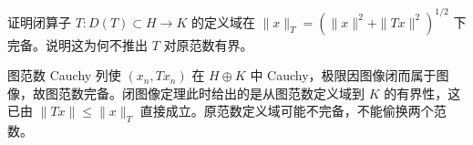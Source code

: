 \begin{exercise}[图范数与闭算子]\label{ex:y7-graph}
证明闭算子 $T:D(T)\subset H\to K$ 的定义域在 $\|x\|_T=(\|x\|^2+\|Tx\|^2)^{1/2}$ 下完备。说明这为何不推出 $T$ 对原范数有界。
\end{exercise}
\begin{solution}
图范数 Cauchy 列使 $(x_n,Tx_n)$ 在 $H\oplus K$ 中 Cauchy，极限因图像闭而属于图像，故图范数完备。闭图像定理此时给出的是从图范数定义域到 $K$ 的有界性，这已由 $\|Tx\|\le\|x\|_T$ 直接成立。原范数定义域可能不完备，不能偷换两个范数。
\end{solution}
